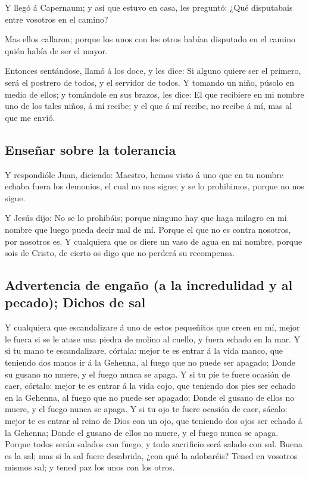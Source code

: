  Y llegó á Capernaum; y así que estuvo en casa, les
preguntó: ¿Qué disputabais entre vosotros en el camino?

 Mas ellos callaron; porque los unos con los otros habían
disputado en el camino quién había de ser el mayor.

 Entonces sentándose, llamó á los doce, y les dice: Si
alguno quiere ser el primero, será el postrero de todos, y el servidor
de todos.  Y tomando un niño, púsolo en medio de ellos; y
tomándole en sus brazos, les dice:  El que recibiere en
mi nombre uno de los tales niños, á mí recibe; y el que á mí recibe, no
recibe á mí, mas al que me envió.

\hypertarget{enseuxf1ar-sobre-la-tolerancia}{%
\subsection{Enseñar sobre la
tolerancia}\label{enseuxf1ar-sobre-la-tolerancia}}

 Y respondióle Juan, diciendo: Maestro, hemos visto á uno
que en tu nombre echaba fuera los demonios, el cual no nos sigue; y se
lo prohibimos, porque no nos sigue.

 Y Jesús dijo: No se lo prohibáis; porque ninguno hay que
haga milagro en mi nombre que luego pueda decir mal de mí.
 Porque el que no es contra nosotros, por nosotros es.
 Y cualquiera que os diere un vaso de agua en mi nombre,
porque sois de Cristo, de cierto os digo que no perderá su recompensa.

\hypertarget{advertencia-de-engauxf1o-a-la-incredulidad-y-al-pecado-dichos-de-sal}{%
\subsection{Advertencia de engaño (a la incredulidad y al pecado);
Dichos de
sal}\label{advertencia-de-engauxf1o-a-la-incredulidad-y-al-pecado-dichos-de-sal}}

 Y cualquiera que escandalizare á uno de estos pequeñitos
que creen en mí, mejor le fuera si se le atase una piedra de molino al
cuello, y fuera echado en la mar.  Y si tu mano te
escandalizare, córtala: mejor te es entrar á la vida manco, que teniendo
dos manos ir á la Gehenna, al fuego que no puede ser apagado;
 Donde su gusano no muere, y el fuego nunca se apaga.
 Y si tu pie te fuere ocasión de caer, córtalo: mejor te
es entrar á la vida cojo, que teniendo dos pies ser echado en la
Gehenna, al fuego que no puede ser apagado;  Donde el
gusano de ellos no muere, y el fuego nunca se apaga.  Y
si tu ojo te fuere ocasión de caer, sácalo: mejor te es entrar al reino
de Dios con un ojo, que teniendo dos ojos ser echado á la Gehenna;
 Donde el gusano de ellos no muere, y el fuego nunca se
apaga.  Porque todos serán salados con fuego, y todo
sacrificio será salado con sal.  Buena es la sal; mas si
la sal fuere desabrida, ¿con qué la adobaréis? Tened en vosotros mismos
sal; y tened paz los unos con los otros.

